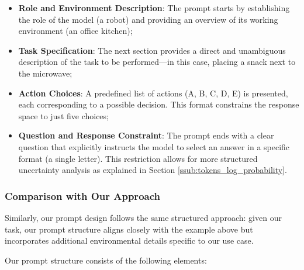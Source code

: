 \begin{itemize}
  \item \textbf{Role and Environment Description}: The prompt starts by establishing
    the role of the model (a robot) and providing an overview of its working environment
    (an office kitchen);

  \item \textbf{Task Specification}: The next section provides a direct and unambiguous
    description of the task to be performed—in this case, placing a snack next
    to the microwave;

  \item \textbf{Action Choices}: A predefined list of actions (A, B, C, D, E) is
    presented, each corresponding to a possible decision. This format constrains
    the response space to just five choices;

  \item \textbf{Question and Response Constraint}: The prompt ends with a clear question
    that explicitly instructs the model to select an answer in a specific format
    (a single letter). This restriction allows for more structured uncertainty
    analysis as explained in Section \ref{ssub:tokens_log_probability}.
\end{itemize}

\subsubsection{Comparison with Our Approach}

Similarly, our prompt design follows the same structured approach: given our task,
our prompt structure aligns closely with the example above but incorporates
additional environmental details specific to our use case.

Our prompt structure consists of the following elements:

